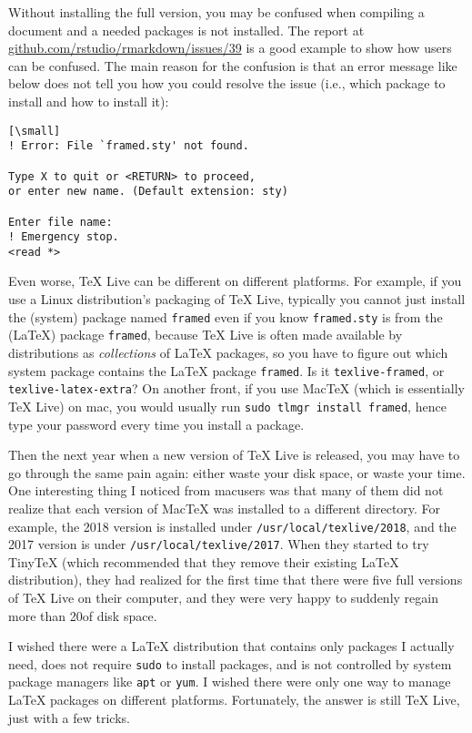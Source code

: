 \documentclass{ltugboat}
\def\macOS{mac\acro{OS}}
\def\GB{\acro{GB}}
\begin{document}
Without installing the full version, you may be confused when compiling
a document and a needed packages is not installed. The report at
\url{github.com/rstudio/rmarkdown/issues/39} is a good example
to show how users can be confused. The main reason for the confusion is
that an error message like below does not tell you how you could resolve
the issue (i.e., which package to install and how to install it):

\begin{verbatim}[\small]
! Error: File `framed.sty' not found.

Type X to quit or <RETURN> to proceed,
or enter new name. (Default extension: sty)

Enter file name: 
! Emergency stop.
<read *> 
\end{verbatim}

Even worse, \TeX{} Live can be different on different platforms. For
example, if you use a Linux distribution's packaging of \TeX{} Live,
typically you cannot just install the (system) package named
\texttt{framed} even if you know \texttt{framed.sty} is from the (\LaTeX{})
package \texttt{framed}, because \TeX{} Live is often made available by
distributions as \emph{collections} of \LaTeX{} packages, so you have to
figure out which system package contains the \LaTeX{} package
\texttt{framed}. Is it \texttt{texlive-framed}, or
\texttt{texlive-latex-extra}? On another front, if you use MacTeX (which
is essentially \TeX{} Live) on \macOS, you would usually run
\texttt{sudo\ tlmgr\ install\ framed}, hence type your password every
time you install a package.

Then the next year when a new version of \TeX{} Live is released, you may
have to go through the same pain again: either waste your disk space, or
waste your time. One interesting thing I noticed from \macOS users was
that many of them did not realize that each version of MacTeX was
installed to a different directory. For example, the 2018 version is
installed under \texttt{/usr/local/texlive/2018}, and the 2017 version
is under \texttt{/usr/local/texlive/2017}. When they started to try
TinyTeX (which recommended that they remove their existing \LaTeX{}
distribution), they had realized for the first time that there were five
full versions of \TeX{} Live on their computer, and they were very happy to
suddenly regain more than 20\GB of disk space.

I wished there were a \LaTeX{} distribution that contains only packages I
actually need, does not require \texttt{sudo} to install packages, and
is not controlled by system package managers like \texttt{apt} or
\texttt{yum}. I wished there were only one way to manage \LaTeX{} packages
on different platforms. Fortunately, the answer is still \TeX{} Live, just
with a few tricks.
\end{document}
